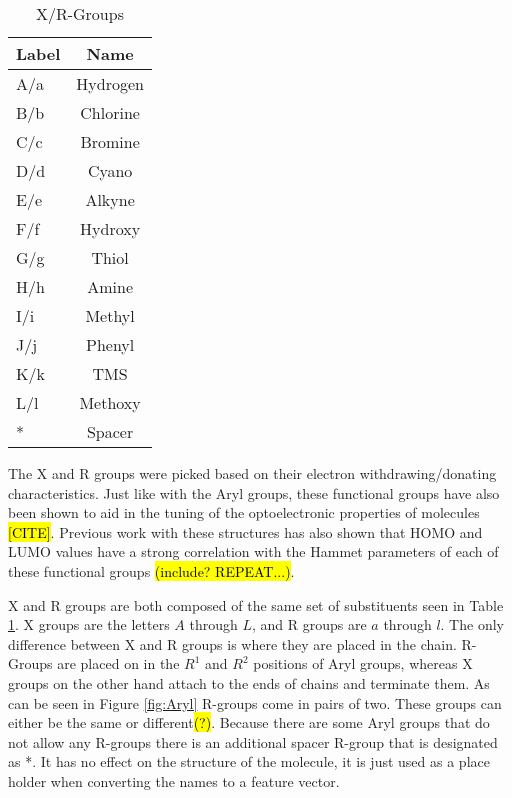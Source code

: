 \documentclass[10pt]{article}
\begin{document}
\begin{table}[H]
  \centering
  \caption{X/R-Groups}
  \begin{tabular}{lc}
    Label   & Name      \\
    \hline
    A/a     & Hydrogen  \\
    B/b     & Chlorine  \\
    C/c     & Bromine   \\
    D/d     & Cyano     \\
    E/e     & Alkyne    \\
    F/f     & Hydroxy   \\
    G/g     & Thiol     \\
    H/h     & Amine     \\
    I/i     & Methyl    \\
    J/j     & Phenyl    \\
    K/k     & TMS       \\
    L/l     & Methoxy   \\
    *       & Spacer    \\
    \hline
  \end{tabular}
  \label{tab:xrgroups}
\end{table}

The X and R groups were picked based on their electron withdrawing/donating characteristics. Just like with the Aryl groups, these functional groups have also been shown to aid in the tuning of the optoelectronic properties of molecules \hl{[CITE]}. Previous work with these structures has also shown that HOMO and LUMO values have a strong correlation with the Hammet parameters of each of these functional groups \hl{(include? REPEAT...)}.

X and R groups are both composed of the same set of substituents seen in Table \ref{tab:xrgroups}. X groups are the letters $A$ through $L$, and R groups are $a$ through $l$. The only difference between X and R groups is where they are placed in the chain. R-Groups are placed on in the $R^1$ and $R^2$ positions of Aryl groups, whereas X groups on the other hand attach to the ends of chains and terminate them. As can be seen in Figure \ref{fig:Aryl} R-groups come in pairs of two. These groups can either be the same or different\hl{(?)}. Because there are some Aryl groups that do not allow any R-groups there is an additional spacer R-group that is designated as *. It has no effect on the structure of the molecule, it is just used as a place holder when converting the names to a feature vector.
\end{document}
